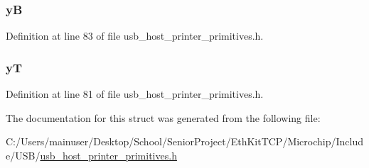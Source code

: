 \subsubsection[{y\+B}]{ y\+B}\label{struct_u_s_b___p_r_i_n_t___s_c_r_e_e_n___i_n_f_o_a75f3fc106ada28aab0c4a192326006c8}


Definition at line 83 of file usb\+\_\+host\+\_\+printer\+\_\+primitives.\+h.

\hypertarget{struct_u_s_b___p_r_i_n_t___s_c_r_e_e_n___i_n_f_o_a949864b828dc476d6108029a6586084d}{}
\subsubsection[{y\+T}]{ y\+T}\label{struct_u_s_b___p_r_i_n_t___s_c_r_e_e_n___i_n_f_o_a949864b828dc476d6108029a6586084d}


Definition at line 81 of file usb\+\_\+host\+\_\+printer\+\_\+primitives.\+h.



The documentation for this struct was generated from the following file\+:\begin{DoxyCompactItemize}
\item 
C\+:/\+Users/mainuser/\+Desktop/\+School/\+Senior\+Project/\+Eth\+Kit\+T\+C\+P/\+Microchip/\+Include/\+U\+S\+B/\hyperlink{usb__host__printer__primitives_8h}{usb\+\_\+host\+\_\+printer\+\_\+primitives.\+h}\end{DoxyCompactItemize}
